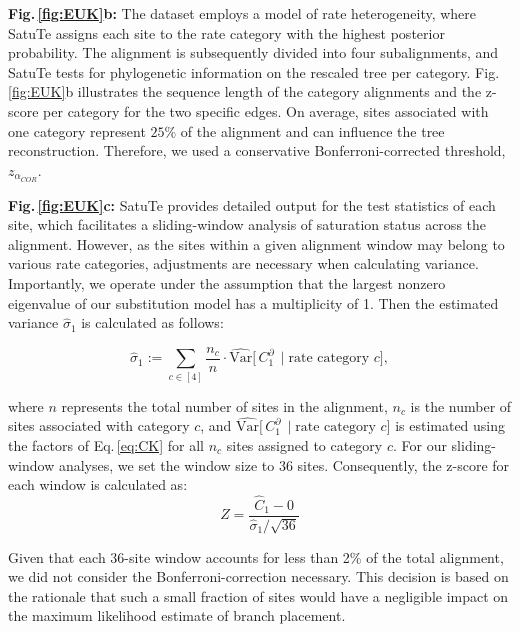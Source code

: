 \medskip
\noindent \textbf{Fig.\,\ref{fig:EUK}b:}
The dataset employs a model of rate heterogeneity, where SatuTe assigns each site to the rate category with the highest posterior probability. The alignment is subsequently divided into four subalignments, and SatuTe tests for phylogenetic information on the rescaled tree per category. Fig.\,\ref{fig:EUK}b illustrates the sequence length of the category alignments and the z-score per category for the two specific edges.  On average, sites associated with one category represent $25\%$ of the alignment and can  influence the tree reconstruction. Therefore, we used a conservative Bonferroni-corrected threshold, $z_{\alpha_{COR}}$. 

\medskip
\noindent \textbf{Fig.\,\ref{fig:EUK}c:}
SatuTe provides detailed output for the test statistics of each site, which facilitates a sliding-window analysis of saturation status across the alignment. However, as the sites within a given alignment window may belong to various rate categories, adjustments are necessary when calculating variance. Importantly, we operate under the assumption that the largest nonzero eigenvalue of our substitution model has a multiplicity of 1. Then the estimated variance $\hat\sigma_1$ is calculated as follows:

\begin{equation}
\hat\sigma_1 := \sum_{c\in[4]} \frac{n_c}{n}\cdot\mathrm{\widehat{Var}}\Big[\, C^\partial_1 \,\mid \text{rate category $c$}\Big],
\end{equation}

where $n$ represents the total number of sites in the alignment, $n_c$ is the number of sites associated with category $c$, and $\mathrm{\widehat{Var}}\Big[\, C^\partial_1 \,\mid \text{rate category $c$}\Big]$ is estimated using the factors of Eq.\,\eqref{eq:CK} for all $n_c$ sites assigned to category $c$. For our sliding-window analyses, we set the window size to 36 sites. Consequently, the z-score for each window is calculated as:
\begin{equation}
Z = \frac{\hat{C}_1-0}
{
\hat\sigma_1/\sqrt{
36
}
}
\end{equation}

\noindent Given that each 36-site window accounts for less than 2\% of the total alignment, we did not consider the Bonferroni-correction necessary. This decision is based on the rationale that such a small fraction of sites would have a negligible impact on the maximum likelihood estimate of branch placement.
\bigskip

